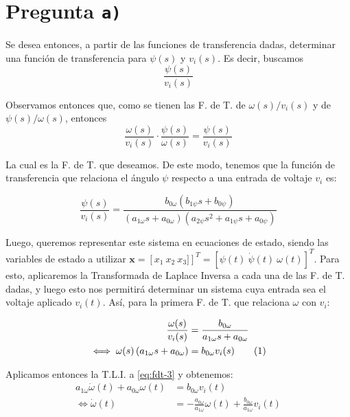 \section{Pregunta \texttt{a)}}

Se desea entonces, a partir de las funciones de transferencia dadas, determinar
una función de transferencia para $\psi (s)$ y $v_{i} (s)$. Es decir, buscamos
\begin{equation}
  \frac{\psi (s)}{v_{i} (s)}
  \label{eq:fdt-1}
\end{equation}

Observamos entonces que, como se tienen las F. de T. de $\omega (s) / v_{i} (s)$
y de $\psi (s) / \omega (s)$, entonces
\begin{equation}
  \frac{\omega (s)}{v_{i} (s)} \cdot \frac{\psi (s)}{\omega (s)} = \frac{\psi (s)}{v_{i} (s)}
\end{equation}

La cual es la F. de T. que deseamos. De este modo, tenemos que la función de
transferencia que relaciona el ángulo $\psi$ respecto a una entrada de voltaje
$v_{i}$ es:

\begin{equation}
  \frac{\psi (s)}{v_{i} (s)} =
    \frac{b_{0\omega}\left(b_{1\psi}s + b_{0\psi}\right)}
    {\left(a_{1\omega}s + a_{0\omega}\right)\left(a_{2\psi}s^{2} + a_{1\psi}s + a_{0\psi}\right)}
  \label{eq:fdt-2}
\end{equation}

Luego, queremos representar este sistema en ecuaciones de estado, siendo las
variables de estado a utilizar
$\mathbf{x} = \left[x_{1}\ x_{2}\ x_{3}]\right]^{T} = \left[\psi (t)\ \dot\psi (t)\ \omega (t)\right]^{T}$.
Para esto, aplicaremos la Transformada de Laplace Inversa a cada una de las
F. de T. dadas, y luego esto nos permitirá determinar un sistema cuya entrada
sea el voltaje aplicado $v_{i} (t)$. Así, para la primera F. de T. que relaciona
$\omega$ con $v_{i}$:

\begin{align}
  \frac{\omega (s)}{v_{i} (s)} &= \frac{b_{0\omega}}{a_{1\omega}s + a_{0\omega}} \\
  \iff \omega (s) \left(a_{1\omega}s + a_{0\omega}\right) &= b_{0\omega}v_{i} (s)
    \stepcounter{equation}\tag{\theequation}\label{eq:fdt-3}
\end{align}

Aplicamos entonces la T.L.I. a \eqref{eq:fdt-3} y obtenemos:
\begin{align}
  a_{1\omega}\dot\omega (t) + a_{0\omega}\omega (t) &= b_{0\omega}v_{i} (t) \\
  \iff \dot\omega (t) &= -\frac{a_{0\omega}}{a_{1\omega}}\omega (t) + \frac{b_{0\omega}}{a_{1\omega}}v_{i} (t)
\end{align}
\FloatBarrier
\newpage
